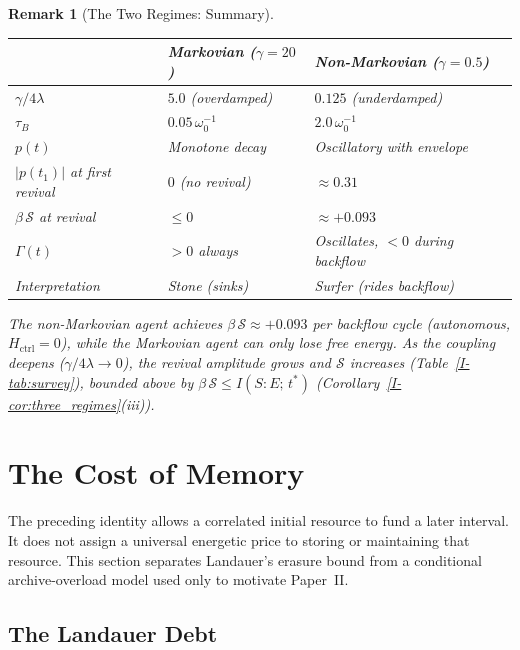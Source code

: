\documentclass[12pt,a4paper,openany]{book}
\newtheorem{remark}[theorem]{Remark}
\begin{document}
\begin{remark}[The Two Regimes: Summary]
\label{I-rem:two_regimes}
\begin{center}
\begin{tabular}{@{}lll@{}}
\toprule
& \textbf{Markovian ($\gamma = 20$)}
& \textbf{Non-Markovian ($\gamma = 0.5$)} \\
\midrule
$\gamma / 4\lambda$ & $5.0$ (overdamped)
  & $0.125$ (underdamped) \\
$\tau_B$ & $0.05\,\omega_0^{-1}$
  & $2.0\,\omega_0^{-1}$ \\
$p(t)$ & Monotone decay
  & Oscillatory with envelope \\
$|p(t_1)|$ at first revival & $0$ (no revival)
  & $\approx 0.31$ \\
$\beta\,\mathcal{S}$ at revival & $\leq 0$
  & $\approx +0.093$ \\
$\Gamma(t)$ & $> 0$ always
  & Oscillates, $< 0$ during backflow \\
Interpretation & Stone (sinks)
  & Surfer (rides backflow) \\
\bottomrule
\end{tabular}
\end{center}
The non-Markovian agent achieves
$\beta\,\mathcal{S} \approx +0.093$
per backflow cycle (autonomous, $H_{\mathrm{ctrl}} = 0$),
while the Markovian agent can only lose free energy.
As the coupling deepens ($\gamma/4\lambda \to 0$), the
revival amplitude grows and
$\mathcal{S}$ increases
(Table~\ref{I-tab:survey}), bounded above by
$\beta\,\mathcal{S} \leq I(S{:}E;\, t^*)$
(Corollary~\ref{I-cor:three_regimes}(iii)).
\end{remark}

\section{The Cost of Memory}
\label{I-sec:cost}

The preceding identity allows a correlated initial resource to fund a
later interval.  It does not assign a universal energetic price to
storing or maintaining that resource.  This section separates
Landauer's erasure bound from a conditional archive-overload model used
only to motivate Paper~II.

\subsection{The Landauer Debt}
\end{document}
